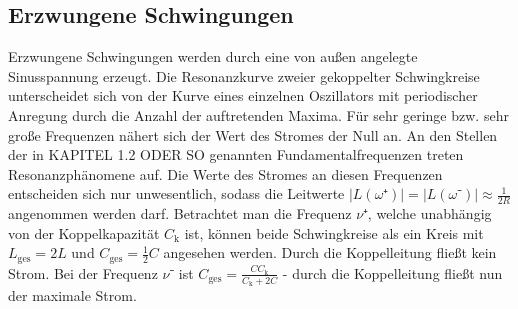 \subsection{Erzwungene Schwingungen}

Erzwungene Schwingungen werden durch eine von außen angelegte Sinusspannung erzeugt. 
Die Resonanzkurve zweier gekoppelter Schwingkreise unterscheidet sich von der Kurve eines einzelnen Oszillators mit periodischer Anregung durch die Anzahl der auftretenden Maxima. 
Für sehr geringe bzw. sehr große Frequenzen nähert sich der Wert des Stromes der Null an.
 An den Stellen der in KAPITEL 1.2 ODER SO genannten Fundamentalfrequenzen treten Resonanzphänomene auf.
 Die Werte des Stromes an diesen Frequenzen entscheiden sich nur unwesentlich, sodass die Leitwerte $|L(\omega⁺)|=|L(\omega⁻)|\approx\frac{1}{2R}$  angenommen werden darf. 
Betrachtet man die Frequenz $\nu⁺$, welche unabhängig von der Koppelkapazität $C_\mathup{k}$ ist, können beide Schwingkreise als ein Kreis mit $L_\mathup{ges}=2L$ und $C_\mathup{ges}=\frac{1}{2}C$ angesehen werden. 
Durch die Koppelleitung fließt kein Strom.
 Bei der Frequenz $\nu⁻$ ist $C_\mathup{ges}=\frac{C C_\mathup{k}}{C_\mathup{k}+2C}$ - durch die Koppelleitung fließt nun der maximale Strom.
